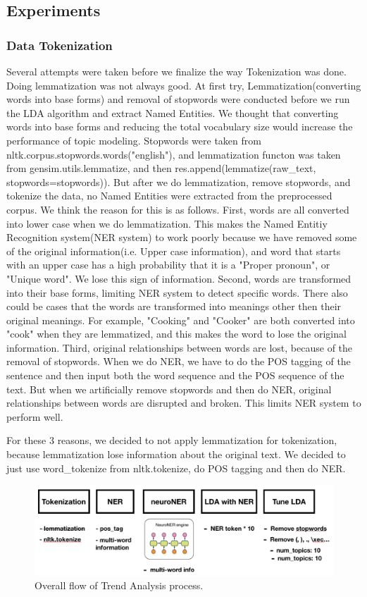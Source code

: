 \subsection{Experiments}
\subsubsection{Data Tokenization}
Several attempts were taken before we finalize the way Tokenization was done. Doing lemmatization was not always good.
At first try, Lemmatization(converting words into base forms) and removal of stopwords were conducted before we run the LDA algorithm and extract Named Entities. We thought that converting words into base forms and reducing the total vocabulary size would increase the performance of topic modeling. Stopwords were taken from nltk.corpus.stopwords.words("english"), and lemmatization functon was taken from
gensim.utils.lemmatize, and then res.append(lemmatize(raw\_text, stopwords=stopwords)). But after we do lemmatization, remove stopwords, and tokenize the data, no Named Entities were extracted from the preprocessed corpus. We think the reason for this is as follows. 
First, words are all converted into lower case when we do lemmatization. This makes the Named Entitiy Recognition system(NER system) to work poorly because we have removed some of the original information(i.e. Upper case information), and word that starts with an upper case has a high probability that it is a "Proper pronoun", or "Unique word". We lose this sign of information.
Second, words are transformed into their base forms, limiting NER system to detect specific words. There also could be cases that the words are transformed into meanings other then their original meanings. For example, "Cooking" and "Cooker" are both converted into "cook" when they are lemmatized, and this makes the word to lose the original information.
Third, original relationships between words are lost, because of the removal of stopwords. When we do NER, we have to do the POS tagging of the sentence and then input both the word sequence and the POS sequence of the text. But when we artificially remove stopwords and then do NER, original relationships between words are disrupted and broken. This limits NER system to perform well.

For these 3 reasons, we decided to not apply lemmatization for tokenization, because lemmatization lose information about the original text. We decided to just use word\_tokenize from nltk.tokenize, do POS tagging and then do NER.
\begin{figure}[!htbp]
  \centering
  \includegraphics[width=0.8\linewidth]{trend_overall.png}
  \caption{Overall flow of Trend Analysis process.}
\end{figure}

